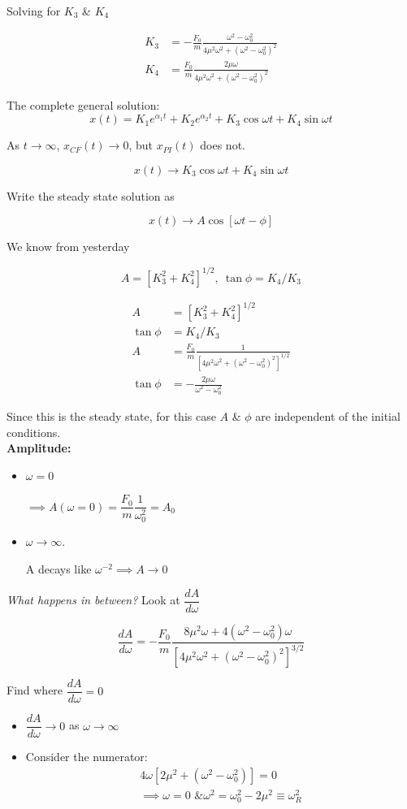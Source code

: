 \documentclass[twoside]{scrartcl}
\begin{document}
Solving for $K_3$ \& $K_4$

\[
\begin{aligned}
   K_3 &= -\frac{F_0}{m}\frac{\omega^2 - \omega_0^2}{4\mu^2\omega^2 + (\omega^2 - \omega_0^2)^2}\\
   K_4 &= \frac{F_0}{m}\frac{2\mu\omega}{4\mu^2\omega^2 + (\omega^2 - \omega_0^2)^2}  
\end{aligned}
\]

The complete general solution:
\[x(t) = K_1e^{\alpha_1t} + K_2e^{\alpha_2t} + K_3\cos\omega t + K_4\sin\omega t\]

As $t \to \infty$, $x_{CF}(t) \to 0$, but $x_{PI}(t)$ does not. 

\[x(t) \to K_3\cos\omega t + K_4\sin\omega t\]

Write the steady state solution as 

\[x(t) \to A\cos[\omega t - \phi]\]

We know from yesterday 

\[A = [K_3^2 + K_4^2]^{1/2},~\tan\phi = K_4/K_3\]

\[
\begin{aligned}
A &= [K_3^2 + K_4^2]^{1/2}\\
\tan\phi &= K_4/K_3\\
  A &= \frac{F_0}{m} \frac{1}{[4\mu^2\omega^2 + (\omega^2 - \omega_0^2)^2]^{1/2}}\\
  \tan\phi &= -\frac{2\mu\omega}{\omega^2-\omega_0^2}
\end{aligned}
\]

Since this is the steady state, for this case $A$ \& $\phi$ are independent of the initial conditions.\\

\textbf{Amplitude:}
\begin{itemize}
  \item $\omega = 0$
  
  $ \implies A(\omega = 0) = \dfrac{F_0}{m}\dfrac{1}{\omega_0^2} = A_0$
  \item $\omega \to \infty$. 
  
  A decays like $\omega^{-2} \implies A \to 0$
\end{itemize}

\emph{What happens in between?} Look at $\dfrac{dA}{d\omega}$

\[\frac{dA}{d\omega} = -\frac{F_0}{m}\frac{8\mu^2\omega + 4(\omega^2-\omega_0^2)\omega}{[4\mu^2\omega^2 + (\omega^2-\omega_0^2)^2]^{3/2}}\]

Find where $\dfrac{dA}{d\omega} = 0$
\begin{itemize}
  \item $\dfrac{dA}{d\omega} \to 0$ as $\omega \to \infty$
  \item Consider the numerator:
  \[
\begin{aligned}
  4\omega[2\mu^2 + (\omega^2 - \omega_0^2)] = 0\\
  \implies \omega = 0 \text{ \& } \omega^2 = \omega_0^2 - 2\mu^2 \equiv \omega_R^2
\end{aligned}
\]

\end{itemize}
\end{document}
